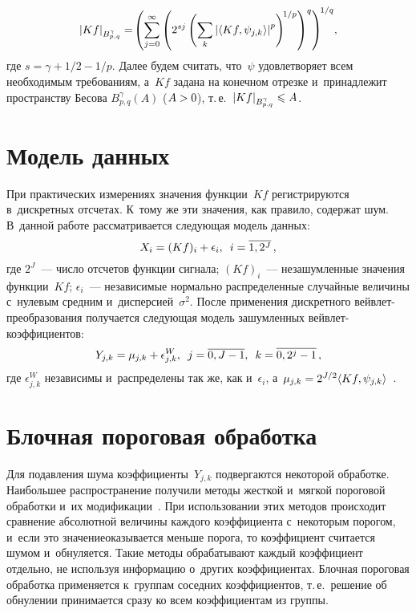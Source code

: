 \begin{multicols}{2}
\noindent
$$
\left\vert Kf\right\vert_{{B}^{\gamma}_{p,q}}=\!\left(\sum\limits_{j=0}^{\infty}\left(2^{sj
}\left(\sum\limits_{k}\left\vert\langle 
Kf,\psi_{j,k}\rangle\right\vert^p\right)^{\!1/p}\right)^q\right)^{\!1/q}\!,
$$
где $s=\gamma+1/2-1/p$. Далее будем считать, что~$\psi$ удовле\-тво\-ря\-ет всем 
необходимым требованиям, а~$Kf$ задана на конечном отрезке и~принадлежит 
пространству Бесова ${B}^{\gamma}_{p,q}(A)$ ($A\hm>0$), т.\,е.\ 
$\abs{Kf}_{{B}^{\gamma}_{p,q}}\hm\leqslant A$.

\vspace*{-6pt}

\section{Модель данных}

\vspace*{-3pt}

При практических измерениях значения функции~$Kf$ регистрируются в~дискретных 
отсчетах. К~тому же эти значения, как правило, содержат шум. В~данной работе 
рассматривается следующая модель данных:
\begin{equation*}
X_i = (Kf)_i + \epsilon_i, \enskip i =\overline{1, 2^J}\,,
\end{equation*}
где $2^J$~--- число отсчетов функции сигнала; $(Kf)_i$~--- незашумленные значения 
функции~$Kf$; $\epsilon_i$~--- независимые нормально распределенные случайные 
величины с~нулевым средним и~дисперсией~$\sigma^2$.
После применения дискретного вейв\-лет-пре\-обра\-зо\-ва\-ния получается следующая модель 
зашумленных вейв\-лет-ко\-эф\-фи\-ци\-ен\-тов:
\begin{equation*}
Y_{j,k}=\mu_{j,k}+\epsilon^W_{j,k},\enskip j=\overline{0,J-1},\enskip k=\overline{0,2^{j}-1}\,,
\end{equation*}
где $\epsilon^W_{j,k}$ независимы и~распределены так же, как и~$\epsilon_i$, 
а~$\mu_{j,k}\hm= 2^{J/2}\langle Kf,\psi_{j,k}\rangle$~\cite{Mall99}.

\vspace*{-6pt}


\section{Блочная пороговая обработка}

\vspace*{-3pt}

Для подавления шума коэффициенты~$Y_{j,k}$ подвергаются некоторой обработке. 
Наибольшее распространение получили методы жесткой и~мягкой пороговой обработки 
и~их модификации~\cite{DonJ94, DonJ95, DonJ98, G98, PK05, LC10, HL10, HX15, ZC15}. При использовании этих методов происходит сравнение абсолютной величины 
каждого коэффициента с~некоторым порогом, и~если это значение\linebreak оказывается меньше 
порога, то коэффициент считается шумом и~обнуляется. Такие методы обрабатывают 
каждый коэффициент отдельно, не используя информацию о~других коэффициентах. 
\mbox{Блочная} пороговая обработка применяется к~группам соседних коэффициентов, т.\,е.\ 
решение об обнулении принимается сразу ко всем коэффициентам из группы.


\end{multicols}
